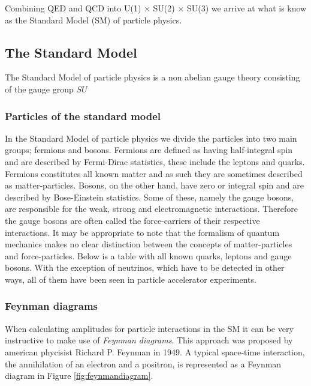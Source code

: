 Combining QED and QCD into U(1) $\times$ SU(2) $\times$ SU(3) we arrive at what is know as the Standard Model (SM) of particle physics.

\subsection{The Standard Model}
The Standard Model of particle physics is a non abelian gauge theory consisting of the gauge group $SU$

\subsubsection{Particles of the standard model}

In the Standard Model of particle physics we divide the particles into two main groups; fermions and bosons. Fermions are defined as having half-integral spin and are described by Fermi-Dirac statistics, these include the leptons and quarks. Fermions constitutes all known matter and as such they are sometimes described as matter-particles. Bosons, on the other hand, have zero or integral spin and are described by Bose-Einstein statistics. Some of these, namely the gauge bosons, are responsible for the weak, strong and electromagnetic interactions. Therefore the gauge bosons are often called the force-carriers of their respective interactions. It may be appropriate to note that the formalism of quantum mechanics makes no clear distinction between the concepts of matter-particles and force-particles. Below is a table with all known quarks, leptons and gauge bosons. With the exception of neutrinos, which have to be detected in other ways, all of them have been seen in particle accelerator experiments.


\subsubsection{Feynman diagrams}
When calculating amplitudes for particle interactions in the SM it can be very instructive to make use of \emph{Feynman diagrams}. This approach was proposed by american phycisist Richard P. Feynman in 1949\cite{feynman1949sta}. A typical space-time interaction, the annihilation of an electron and a positron, is represented as a Feynman diagram in Figure \ref{fig:feynmandiagram}.

